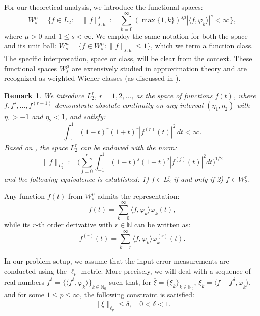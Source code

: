 \documentclass[10pt]{extarticle}
\newtheorem{remark}[theorem]{Remark}
\begin{document}
For our theoretical analysis, we introduce the functional spaces:
$$
W_{s}^\mu =\{f\in L_{2}: \quad
\|f\|_{s,\mu}^s :=\sum_{k=0}^{\infty} ({\max\{1,k\}})^{s\mu}|\langle f,
\varphi_k\rangle|^s<\infty\},
$$
where $\mu>0$ and $1\le s<\infty$. We employ the same notation for both the space and its unit ball: $W_{s}^{\mu} = \{f\in W_{s}^{\mu}\!: \|f\|_{s,\mu} \leq 1\}$, which we term a function class. The specific interpretation, space or class, will be clear from the context.
These functional spaces $W_{s}^\mu$ are extensively studied in approximation theory and are recognized as weighted Wiener classes (as discussed in \cite{Kolom2023}).

\begin{remark} \label{Tom}
We introduce $L^r_{2}$, $r=1,2,\ldots$, as the space of functions $f(t)$, where $f, f',\ldots, f^{(r-1)}$
demonstrate absolute continuity on any interval $(\eta_1,\eta_2)$ with $\eta_1>-1$ and $\eta_2<1$, and satisfy:
$$\int_{-1}^{1} (1-t)^{r} (1+t)^{r} |f^{(r)}(t)|^2 \, d t < \infty .$$
Based on \cite{Tom}, the space $L^r_{2}$ can be endowed with the norm:
$$
\|f\|_{L^r_{2}} := \Big(\sum_{j=0}^r \int_{-1}^{1} (1-t)^{j} (1+t)^{j} |f^{(j)}(t)|^2 dt\Big)^{1/2}
$$
and the following equivalence is established:
1) $f\in L^r_{2}$ if and only if 2) $f\in W^r_{2}$.
\end{remark}

Any function $f(t)$ from $W_{s}^{\mu}$ admits the representation:
\begin{equation}\label{function}
	f(t) = \sum_{k=0}^{\infty}\langle f, \varphi_k \rangle \varphi_k(t),
\end{equation}
while its $r$-th order derivative with $r\in \mathbb{N}$ can be written as:
\begin{equation}\label{r_deriv}
	f^{(r)}(t) = \sum_{k=r}^{\infty}\langle f, \varphi_k \rangle \varphi_k^{(r)}(t).
\end{equation}

In our problem setup, we assume that the input error measurements are conducted using the $\ell_p$ metric.
More precisely, we will deal with a sequence of real numbers $\overline{f^\delta}= \{\langle
f^\delta, \varphi_{k} \rangle\}_{k\in\mathbb{N}_0}$ such that, for $\overline{\xi}=
\{\xi_{k}\}_{k\in\mathbb{N}_0}$, $\xi_{k}=\langle f-f^\delta, \varphi_{k}\rangle$, and for some $1\leq
p\leq \infty$, the following constraint is satisfied:
\begin{equation}\label{perturbation2}
\|\overline{\xi}\|_{\ell_p} \leq \delta , \quad 0<\delta <1 .
\end{equation}
\end{document}
